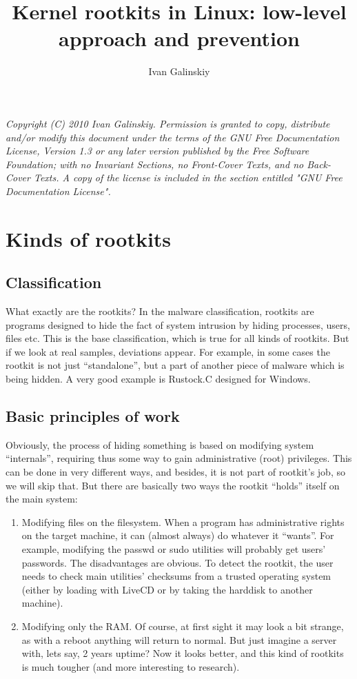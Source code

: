 \documentclass[12pt]{article}
\title{Kernel rootkits in Linux: low-level approach and prevention}
\date{}
\author{Ivan Galinskiy}
\begin{document}
\maketitle

\newpage
  \emph{
  Copyright (C) 2010 Ivan Galinskiy.
    Permission is granted to copy, distribute and/or modify this document
    under the terms of the GNU Free Documentation License, Version 1.3
    or any later version published by the Free Software Foundation;
    with no Invariant Sections, no Front-Cover Texts, and no Back-Cover Texts.
    A copy of the license is included in the section entitled "GNU
    Free Documentation License".}
  \newpage
  
  \section{Kinds of rootkits}
  \subsection{Classification}
  What exactly are the rootkits? In the malware classification, rootkits are
  programs designed to hide the fact of system intrusion by hiding processes,
  users, files etc. This is the base classification, which is true for all
  kinds of rootkits. But if we look at real samples, deviations appear. For
  example, in some cases the rootkit is not just ``standalone'', but a part of
  another piece of malware which is being hidden. A very good example is
  Rustock.C designed for Windows.

  \subsection{Basic principles of work}
  Obviously, the process of hiding something is based on modifying system
  ``internals'', requiring thus some way to gain administrative (root)
  privileges. This can be done in very different ways, and besides, it is not
  part of rootkit's job, so we will skip that. But there are basically two
  ways the rootkit ``holds'' itself on the main system:
  \begin{enumerate}
    \item Modifying files on the filesystem. When a program has administrative
      rights on the target machine, it can (almost always) do whatever it
      ``wants''. For example, modifying the passwd or sudo utilities will
      probably get users' passwords. The disadvantages are obvious. To detect
      the rootkit, the user needs to check main utilities' checksums from a
      trusted operating system (either by loading with LiveCD or by taking the
      harddisk to another machine).

    \item Modifying only the RAM. Of course, at first sight it may look a bit
      strange, as with a reboot anything will return to normal. But just
      imagine a server with, lets say, 2 years uptime? Now it looks better,
      and this kind of rootkits is much tougher (and more interesting to
      research).
  \end{enumerate}
\end{document}
